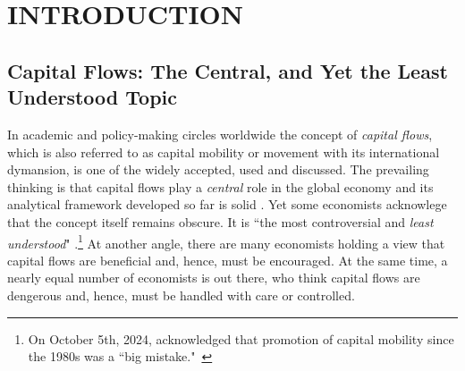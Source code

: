 \newpage

\section{\uppercase{Introduction}}\label{sec:intro}


\subsection{Capital Flows: The Central, and Yet the Least Understood Topic}

In academic and policy-making circles worldwide the concept of \textit{capital flows}, which is also referred to as capital mobility or movement with its international dymansion, is one of the widely accepted, used and discussed. The prevailing thinking is that capital flows play a \textit{central} role in the global economy and its analytical framework developed so far is solid \citep{koepke2019}. Yet some economists acknowlege that the concept itself remains obscure. It is ``the most controversial and \textit{least understood}" \citep{eichengreen2001}.\footnote{On October 5th, 2024, \citeauthor{fukuyama2024} acknowledged that promotion of capital mobility since the 1980s was a ``big mistake."~\citep{fukuyama2024}} At another angle, there are many economists holding a view that capital flows are beneficial and, hence, must be encouraged. At the same time, a nearly equal number of economists is out there, who think capital flows are dengerous and, hence, must be handled with care or controlled.  

